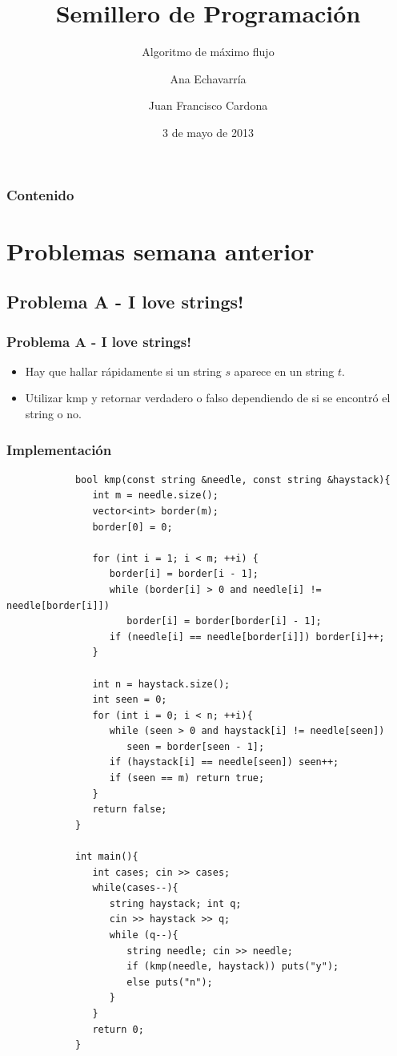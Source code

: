 \documentclass{beamer}
\title{Semillero de Programación}
\subtitle{Algoritmo de máximo flujo}
\author{Ana Echavarría \and Juan Francisco Cardona}
\institute{Universidad EAFIT}
\date{3 de mayo de 2013}
\begin{document}
\begin{frame}
	\titlepage
\end{frame}

\begin{frame}
	\frametitle{Contenido}
	\tableofcontents
\end{frame}

\section[Problemas]{Problemas semana anterior}
	\subsection{Problema A - I love strings!}
	
	\begin{frame}
		\frametitle{Problema A - I love strings!}
		\begin{itemize}
			\item Hay que hallar rápidamente si un string $s$ aparece en un string $t$.
			\item Utilizar kmp y retornar verdadero o falso dependiendo de si se encontró el string o no.
		\end{itemize}
	\end{frame}
	
	\begin{frame}
		\frametitle{Implementación}
		\begin{lstlisting}
			bool kmp(const string &needle, const string &haystack){
			   int m = needle.size();
			   vector<int> border(m);
			   border[0] = 0;

			   for (int i = 1; i < m; ++i) {
			      border[i] = border[i - 1];
			      while (border[i] > 0 and needle[i] != needle[border[i]])
			         border[i] = border[border[i] - 1];
			      if (needle[i] == needle[border[i]]) border[i]++;
			   }

			   int n = haystack.size();
			   int seen = 0;
			   for (int i = 0; i < n; ++i){
			      while (seen > 0 and haystack[i] != needle[seen])
			         seen = border[seen - 1];
			      if (haystack[i] == needle[seen]) seen++;
			      if (seen == m) return true;
			   }
			   return false;
			}

			int main(){
			   int cases; cin >> cases;
			   while(cases--){
			      string haystack; int q;
			      cin >> haystack >> q;
			      while (q--){
			         string needle; cin >> needle;
			         if (kmp(needle, haystack)) puts("y");
			         else puts("n");
			      }
			   }
			   return 0;
			}
		\end{lstlisting}
	\end{frame}
	
\end{document}
